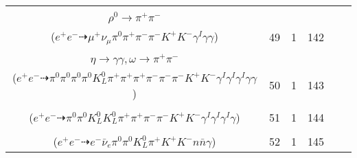 \documentclass[landscape]{article}
\newcounter{rownumbers}
\newcommand\rn{\stepcounter{rownumbers}\arabic{rownumbers}}
\newcommand{\EOLP}{\\ \hline} %
\newcommand{\topoTags}[1]{#1} %
\begin{document}
\begin{longtable}{clcccc}
\rn & \makecell[l]{ $ 
e^{+} e^{-} \rightarrow K^{+} D^{0} D_{s}^{*-} \gamma^{I} ,
D^{0} \rightarrow \mu^{+} \nu_{\mu} K^{-} ,
D_{s}^{*-} \rightarrow D_{s}^{-} \gamma ,
D_{s}^{-} \rightarrow \rho^{-} \eta^{\prime} ,
\rho^{-} \rightarrow \pi^{0} \pi^{-} ,
\eta^{\prime} \rightarrow \rho^{0} \gamma ,
$ \\ $
\rho^{0} \rightarrow \pi^{+} \pi^{-} 
$ \\ ($
e^{+} e^{-} \dashrightarrow \mu^{+} \nu_{\mu} \pi^{0} \pi^{+} \pi^{-} \pi^{-} K^{+} K^{-} \gamma^{I} \gamma \gamma 
$) } & \topoTags{49 & }1 & 142 \EOLP

\rn & \makecell[l]{ $ 
e^{+} e^{-} \rightarrow \eta \bar{K}^{0} D^{*-} D_{s}^{+} \gamma^{I} \gamma^{I} \gamma^{I} ,
\eta \rightarrow \pi^{0} \pi^{0} \pi^{0} ,
\bar{K}^{0} \rightarrow K_{L}^{0} ,
D^{*-} \rightarrow \pi^{-} \bar{D}^{0} ,
D_{s}^{+} \rightarrow \pi^{+} \eta \omega ,
\bar{D}^{0} \rightarrow \pi^{0} \pi^{+} \pi^{-} K^{+} K^{-} ,
$ \\ $
\eta \rightarrow \gamma \gamma ,
\omega \rightarrow \pi^{+} \pi^{-} 
$ \\ ($
e^{+} e^{-} \dashrightarrow \pi^{0} \pi^{0} \pi^{0} \pi^{0} K_{L}^{0} \pi^{+} \pi^{+} \pi^{+} \pi^{-} \pi^{-} \pi^{-} K^{+} K^{-} \gamma^{I} \gamma^{I} \gamma^{I} \gamma \gamma 
$) } & \topoTags{50 & }1 & 143 \EOLP

\rn & \makecell[l]{ $ 
e^{+} e^{-} \rightarrow \pi^{-} \bar{K}^{0} K^{+} \bar{D}^{0} D^{*0} \gamma^{I} \gamma^{I} \gamma^{I} ,
\bar{K}^{0} \rightarrow K_{L}^{0} ,
\bar{D}^{0} \rightarrow \pi^{0} \pi^{0} K_{L}^{0} ,
D^{*0} \rightarrow D^{0} \gamma ,
D^{0} \rightarrow K^{-} a_{1}^{+} ,
a_{1}^{+} \rightarrow \pi^{+} \pi^{+} \pi^{-} 
$ \\ ($
e^{+} e^{-} \dashrightarrow \pi^{0} \pi^{0} K_{L}^{0} K_{L}^{0} \pi^{+} \pi^{+} \pi^{-} \pi^{-} K^{+} K^{-} \gamma^{I} \gamma^{I} \gamma^{I} \gamma 
$) } & \topoTags{51 & }1 & 144 \EOLP

\rn & \makecell[l]{ $ 
e^{+} e^{-} \rightarrow \bar{K}^{0} K^{+} D^{*0} n \bar{\Lambda}_{c}^{-} ,
\bar{K}^{0} \rightarrow K_{L}^{0} ,
D^{*0} \rightarrow D^{0} \gamma ,
\bar{\Lambda}_{c}^{-} \rightarrow e^{-} \bar{\nu}_{e} \bar{\Lambda} ,
D^{0} \rightarrow \pi^{0} \pi^{+} K^{-} ,
\bar{\Lambda} \rightarrow \pi^{0} \bar{n} 
$ \\ ($
e^{+} e^{-} \dashrightarrow e^{-} \bar{\nu}_{e} \pi^{0} \pi^{0} K_{L}^{0} \pi^{+} K^{+} K^{-} n \bar{n} \gamma 
$) } & \topoTags{52 & }1 & 145 \EOLP


\end{longtable}
\end{document}
